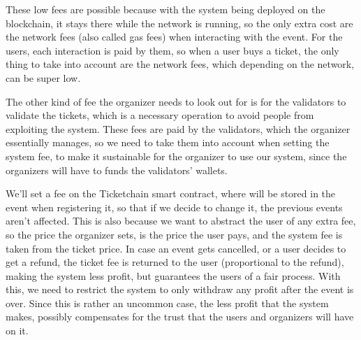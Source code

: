 These low fees are possible because with the system being deployed on the
blockchain, it stays there while the network is running, so the only extra cost
are the network fees (also called gas fees) when interacting with the event.
For the users, each interaction is paid by them, so when a user buys a ticket,
the only thing to take into account are the network fees, which depending on
the network, can be super low.

The other kind of fee the organizer needs to look out for is for the validators
to validate the tickets, which is a necessary operation to avoid people from
exploiting the system. These fees are paid by the validators, which the
organizer essentially manages, so we need to take them into account when
setting the system fee, to make it sustainable for the organizer to use our
system, since the organizers will have to funds the validators' wallets.

We'll set a fee on the Ticketchain smart contract, where will be stored in the
event when registering it, so that if we decide to change it, the previous
events aren't affected. This is also because we want to abstract the user of
any extra fee, so the price the organizer sets, is the price the user pays, and
the system fee is taken from the ticket price. In case an event gets cancelled,
or a user decides to get a refund, the ticket fee is returned to the user
(proportional to the refund), making the system less profit, but guarantees the
users of a fair process. With this, we need to restrict the system to only
withdraw any profit after the event is over. Since this is rather an uncommon
case, the less profit that the system makes, possibly compensates for the trust
that the users and organizers will have on it.
